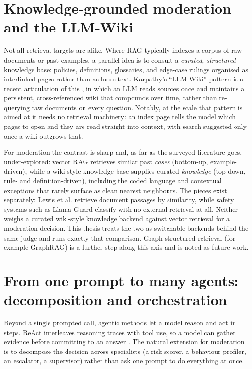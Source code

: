 \section{Knowledge-grounded moderation and the LLM-Wiki}\label{knowledge-grounded-moderation-and-the-llm-wiki}

Not all retrieval targets are alike. Where RAG typically indexes a corpus of raw documents or past examples, a parallel idea is to consult a \emph{curated, structured} knowledge base: policies, definitions, glossaries, and edge-case rulings organised as interlinked pages rather than as loose text. Karpathy's ``LLM-Wiki'' pattern is a recent articulation of this \citep{karpathy2026llmwiki}, in which an LLM reads sources once and maintains a persistent, cross-referenced wiki that compounds over time, rather than re-querying raw documents on every question. Notably, at the scale that pattern is aimed at it needs no retrieval machinery: an index page tells the model which pages to open and they are read straight into context, with search suggested only once a wiki outgrows that.

For moderation the contrast is sharp and, as far as the surveyed literature goes, under-explored: vector RAG retrieves similar past \emph{cases} (bottom-up, example-driven), while a wiki-style knowledge base supplies curated \emph{knowledge} (top-down, rule- and definition-driven), including the coded language and contextual exceptions that rarely surface as clean nearest neighbours. The pieces exist separately: Lewis et al. \citep{rag2020} retrieve document passages by similarity, while safety systems such as Llama Guard \citep{llamaguard2023} classify with no external retrieval at all. Neither weighs a curated wiki-style knowledge backend against vector retrieval for a moderation decision. This thesis treats the two as switchable backends behind the same judge and runs exactly that comparison. Graph-structured retrieval (for example GraphRAG) is a further step along this axis and is noted as future work.

\section{From one prompt to many agents: decomposition and orchestration}\label{agentic-and-multi-agent-systems-for-trust-and-safety}

Beyond a single prompted call, agentic methods let a model reason and act in steps. ReAct interleaves reasoning traces with tool use, so a model can gather evidence before committing to an answer \citep{react2023}. The natural extension for moderation is to decompose the decision across specialists (a risk scorer, a behaviour profiler, an escalator, a supervisor) rather than ask one prompt to do everything at once.

